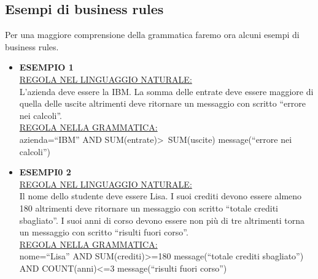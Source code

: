 \subsection{Esempi di business rules}
Per una maggiore comprensione della grammatica faremo ora alcuni esempi di business rules. 
\begin{itemize}
\item \textbf{ESEMPIO 1} \\
\underline{REGOLA NEL LINGUAGGIO NATURALE:} \\
L'azienda deve essere la IBM. La somma delle entrate deve essere maggiore di quella delle uscite altrimenti deve ritornare un messaggio con scritto ``errore nei calcoli''. \\
\underline{REGOLA NELLA GRAMMATICA:} \\
azienda=``IBM'' AND SUM(entrate)\textgreater\ SUM(uscite) message(``errore nei calcoli'')
\item \textbf{ESEMPI0 2} \\
\underline{REGOLA NEL LINGUAGGIO NATURALE:} \\
Il nome dello studente deve essere Lisa. I suoi crediti devono essere almeno 180 altrimenti deve ritornare un messaggio con scritto ``totale crediti sbagliato''. I suoi anni di corso devono essere non pi\`u di tre altrimenti torna un messaggio con scritto ``risulti fuori corso''.  \\
\underline{REGOLA NELLA GRAMMATICA:} \\
nome=``Lisa'' AND SUM(crediti)\textgreater =180 message(``totale crediti sbagliato'') AND COUNT(anni)\textless =3 message(``risulti fuori corso'')
\end{itemize}
